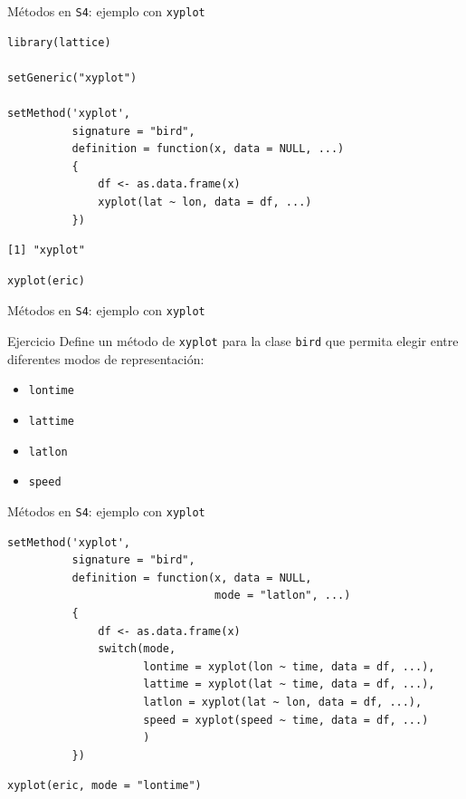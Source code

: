\documentclass[xcolor={usenames,svgnames,dvipsnames}]{beamer}
\begin{document}
\begin{frame}[label={sec:orgfc37420},fragile]{Métodos en \texttt{S4}: ejemplo con \texttt{xyplot}}
 \lstset{language=r,label= ,caption= ,captionpos=b,numbers=none}
\begin{lstlisting}
library(lattice)

setGeneric("xyplot")

setMethod('xyplot',
          signature = "bird",
          definition = function(x, data = NULL, ...)
          {
              df <- as.data.frame(x)
              xyplot(lat ~ lon, data = df, ...)
          })    
\end{lstlisting}

\begin{verbatim}
[1] "xyplot"
\end{verbatim}


\lstset{language=r,label= ,caption= ,captionpos=b,numbers=none}
\begin{lstlisting}
xyplot(eric)
\end{lstlisting}
\end{frame}


\begin{frame}[label={sec:org5828ac7},fragile]{Métodos en \texttt{S4}: ejemplo con \texttt{xyplot}}
 \begin{block}{Ejercicio}
Define un método de \texttt{xyplot} para la clase \texttt{bird} que permita elegir entre diferentes modos de representación:
\begin{itemize}
\item \texttt{lontime}
\item \texttt{lattime}
\item \texttt{latlon}
\item \texttt{speed}
\end{itemize}
\end{block}
\end{frame}

\begin{frame}[label={sec:orga80ef18},fragile]{Métodos en \texttt{S4}: ejemplo con \texttt{xyplot}}
 \lstset{language=r,label= ,caption= ,captionpos=b,numbers=none}
\begin{lstlisting}
setMethod('xyplot',
          signature = "bird",
          definition = function(x, data = NULL,
                                mode = "latlon", ...)
          {
              df <- as.data.frame(x)
              switch(mode,
                     lontime = xyplot(lon ~ time, data = df, ...),
                     lattime = xyplot(lat ~ time, data = df, ...),
                     latlon = xyplot(lat ~ lon, data = df, ...),
                     speed = xyplot(speed ~ time, data = df, ...)
                     )
          })    
\end{lstlisting}

\lstset{language=r,label= ,caption= ,captionpos=b,numbers=none}
\begin{lstlisting}
xyplot(eric, mode = "lontime")
\end{lstlisting}
\end{frame}
\end{document}
